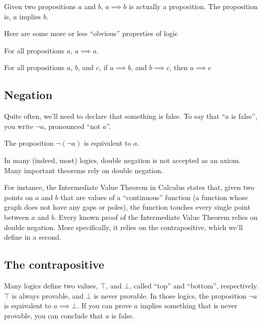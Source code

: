 \begin{remark}
  Given two propositions $a$ and $b$, $a \implies b$ is actually a
  proposition. The proposition is, $a$ implies $b$.
\end{remark}

Here are some more or less ``obvious'' properties of logic

\begin{axiom}
  For all propositions $a$, $a \implies a$.
\end{axiom}

\begin{axiom}
  For all propositions $a$, $b$, and $c$, if $a \implies b$, and $b
  \implies c$, then $a \implies c$
\end{axiom}

\subsection{Negation}

Quite often, we'll need to declare that something is false. To say
that ``$a$ is false'', you write $\lnot a$, pronounced ``not $a$''.

\begin{axiom}
  The proposition $\lnot(\lnot a)$ is equivalent to $a$.
\end{axiom}

\begin{remark}
  In many (indeed, most) logics, double negation is not accepted as an
  axiom. Many important theorems rely on double negation.

  For instance, the Intermediate Value Theorem in Calculus states
  that, given two points on $a$ and $b$ that are values of a
  ``continuous'' function (a function whose graph does not have any
  gaps or poles), the function touches every single point between $a$
  and $b$. Every known proof of the Intermediate Value Theorem relies
  on double negation. More specifically, it relies on the
  contrapositive, which we'll define in a second.
\end{remark}

\subsection{The contrapositive}

Many logics define two values, $\top$, and $\bot$, called ``top'' and
``bottom'', respectively. $\top$ is always provable, and $\bot$ is
never provable. In those logics, the proposition $\lnot a$ is
equivalent to $a \implies \bot$. If you can prove $a$ implies
something that is never provable, you can conclude that $a$ is false.

